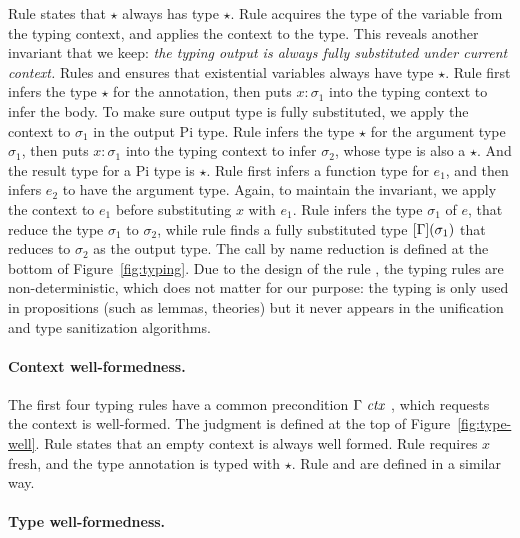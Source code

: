 Rule  states that $\star$ always has type $\star$.
Rule  acquires the type of the variable from the typing context, and
applies the context to the type.
This reveals another invariant that we keep:
\textit{the typing output is always fully substituted under current context.}
Rules  and  ensures that existential variables
always have type $\star$.
Rule  first infers the type $\star$ for the annotation, then puts $x:
\sigma_1$ into the typing context to infer the body. To make sure output type is
fully substituted, we apply the context to $\sigma_1$ in the output Pi type.
Rule  infers the type $\star$ for the argument type $\sigma_1$, then puts
$x: \sigma_1$ into the typing context to infer $\sigma_2$, whose type is also a
$\star$. And the result type for a Pi type is $\star$.
Rule  first infers a function type for $e_1$, and then infers $e_2$ to
have the argument type. Again, to maintain the invariant, we apply the context
to $e_1$ before substituting $x$ with $e_1$.
Rule  infers the type $\sigma_1$ of $e$, that reduce the type
$\sigma_1$ to $\sigma_2$, while rule  finds a fully substituted
type $[\Gamma](\sigma_1)$ that reduces to $\sigma_2$ as the output type. The call by name
reduction is defined at the bottom of Figure~\ref{fig:typing}.
Due to the design of the rule , the typing rules are
non-deterministic, which does not matter for our purpose: the typing is only
used in propositions (such as lemmas, theories) but it never appears in the
unification and type sanitization algorithms.

\paragraph{Context well-formedness.}

The first four typing rules have a common precondition $\Gamma \ \mathit{ctx}\ $,
which requests the context is well-formed.
The judgment is defined at the top of Figure~\ref{fig:type-well}.
Rule  states that an empty context is always well formed.
Rule  requires $x$ fresh, and the type annotation is typed with
$\star$. Rule  and  are defined in a similar
way.

\paragraph{Type well-formedness.}

